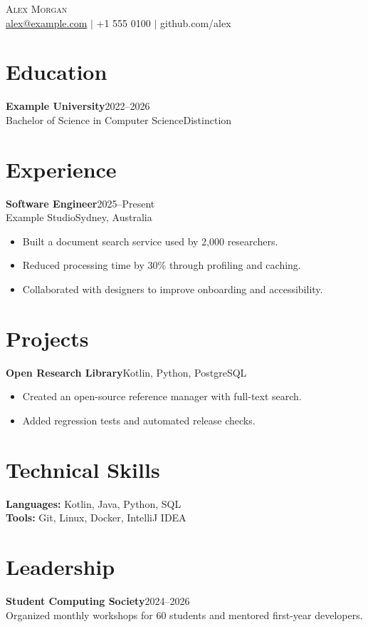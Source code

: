 \documentclass[letterpaper,11pt]{article}
\begin{document}
\begin{center}{\Huge\scshape Alex Morgan}\\[5pt]
\href{mailto:alex@example.com}{alex@example.com} $|$ +1 555 0100 $|$ github.com/alex\end{center}
\section{Education}
\textbf{Example University}\hfill 2022--2026\\Bachelor of Science in Computer Science\hfill Distinction
\section{Experience}
\textbf{Software Engineer}\hfill 2025--Present\\Example Studio\hfill Sydney, Australia
\begin{itemize}[leftmargin=*,itemsep=3pt]
\item Built a document search service used by 2,000 researchers.
\item Reduced processing time by 30\% through profiling and caching.
\item Collaborated with designers to improve onboarding and accessibility.
\end{itemize}
\section{Projects}
\textbf{Open Research Library}\hfill Kotlin, Python, PostgreSQL
\begin{itemize}[leftmargin=*]\item Created an open-source reference manager with full-text search.
\item Added regression tests and automated release checks.\end{itemize}
\section{Technical Skills}
\textbf{Languages:} Kotlin, Java, Python, SQL\\
\textbf{Tools:} Git, Linux, Docker, IntelliJ IDEA
\section{Leadership}
\textbf{Student Computing Society}\hfill 2024--2026\\Organized monthly workshops for 60 students and mentored first-year developers.
\end{document}
